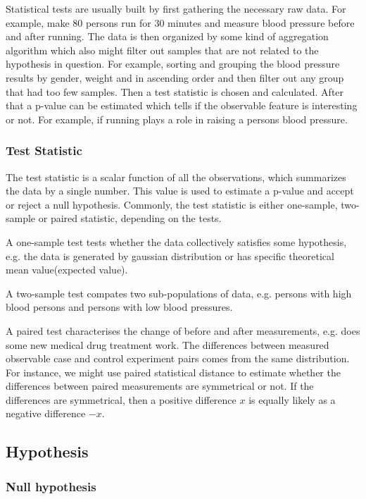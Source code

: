 \documentclass[12pt]{article}
\begin{document}
Statistical tests are usually built by first gathering the necessary raw data. For example, make 80 persons run for 30 minutes and measure blood pressure before and after running. The data is then organized by some kind of aggregation algorithm which also might filter out samples that are not related to the hypothesis in question. For example, sorting and grouping the blood pressure results by gender, weight and in ascending order and then filter out any group that had too few samples. Then a test statistic is chosen and calculated. After that a p-value can be estimated which tells if the observable feature is interesting or not. For example, if running plays a role in raising a persons blood pressure.

\subsubsection{Test Statistic}

The test statistic is a scalar function of all the observations, which summarizes the data by a single number. This value is used to estimate a p-value and accept or reject a null hypothesis. Commonly, the test statistic is either one-sample, two-sample or paired statistic, depending on the tests.

A one-sample test tests whether the data collectively satisfies some hypothesis, e.g. the data is generated by gaussian distribution or has specific theoretical mean value(expected value).

A two-sample test compates two sub-populations of data, e.g. persons with high blood persons and persons with low blood pressures.

A paired test characterises the change of before and after measurements, e.g. does some new medical drug treatment work. The differences between measured observable case and control experiment pairs comes from the same distribution. For instance, we might use paired statistical distance to estimate whether the differences between paired measurements are symmetrical or not. If the differences are symmetrical, then a positive difference $x$ is equally likely as a negative difference $-x$.

\subsection{Hypothesis}

\subsubsection{Null hypothesis}
\end{document}
